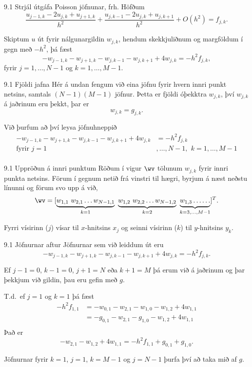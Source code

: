 \begin{frame}{9.1 Strjál útgáfa Poisson jöfnunar, frh.}
Höfðum 
$$
  \frac{u_{j-1,k} - 2u_{j,k} + u_{j+1,k}}{h^2} +
  \frac{u_{j,k-1} - 2u_{j,k} + u_{j,k+1}}{h^2}
  + O(h^2) = f_{j,k}.
  $$
\pause\medskip
  
  Skiptum $u$ út fyrir nálgunargildin $w_{j,k}$, hendum skekkjuliðnum og
  margföldum í gegn með $-h^2$, \pause þá fæst
  $$
  -w_{j-1,k} - w_{j+1,k} - w_{j,k-1} - w_{j,k+1} + 4w_{j,k} = -h^2 f_{j,k},
  $$
 fyrir $j = 1,\ldots,N-1$ og $k=1,\ldots,M-1$.
\end{frame}

\begin{frame}{9.1 Fjöldi jafna}
 Hér á undan fengum við eina jöfnu fyrir hvern innri punkt netsins, 
 samtals $(N-1)(M-1)$ jöfnur. Þetta er fjöldi óþekktra $w_{j,k}$, því
 $w_{j,k}$ á jaðrinum eru þekkt, þar er 
 $$
    w_{j,k} = g_{j,k}.
 $$
 
 \pause\medskip
 Við þurfum að því leysa jöfnuhneppið
 \begin{align*}
  -w_{j-1,k} - w_{j+1,k} - w_{j,k-1} - w_{j,k+1} + 4w_{j,k} &= -h^2 f_{j,k} \\ 
   \text{fyrir } j=1&,\ldots,N-1, \ \, k=1,\ldots,M-1\\
 \end{align*}
\end{frame}

\begin{frame}{9.1 Uppröðun á innri punktum}
 Röðum í vigur $\wv$ tölunum $w_{j,k}$ fyrir innri punkta netsins. 
 Förum í gegnum netið frá vinstri til hægri, byrjum á 
 næst neðstu línunni og förum svo upp á við,
 $$
  \wv = [ \underbrace{w_{1,1} \ w_{2,1} \ldots w_{N-1,1}}_{k=1} 
  \ \underbrace{w_{1,2} \ w_{2,2} \ldots w_{N-1,2}}_{k=2} \ 
  \underbrace{w_{1,3} \ldots  \ldots}_{k=3,\ldots,M-1} ]^T.
 $$
 
 Fyrri vísirinn ($j$) vísar til $x$-hnitsins $x_j$ og seinni vísirinn ($k$)
 til $y$-hnitsins $y_k$.
\end{frame}

\begin{frame}{9.1 Jöfnurnar aftur}
Jöfnurnar sem við leiddum út eru
 $$
  -w_{j-1,k} - w_{j+1,k} - w_{j,k-1} - w_{j,k+1} + 4w_{j,k} = -h^2 f_{j,k}.
 $$
 \pause\medskip
 
 Ef $j-1=0$, $k-1 =0$, $j+1=N$ eða $k+1=M$ þá erum við á jaðrinum og þar
 þekkjum við gildin, þau eru gefin með $g$.
 \pause\medskip
 
 T.d.~ef $j=1$ og $k=1$ þá fæst 
 \begin{align*}
  -h^2 f_{1,1} &= -w_{0,1} - w_{2,1} - w_{1,0} - w_{1,2} + 4w_{1,1} \\
  &= -g_{0,1} - w_{2,1} - g_{1,0} - w_{1,2} + 4w_{1,1}\\
 \end{align*}\pause
 Það er
 $$
  - w_{2,1} - w_{1,2} + 4w_{1,1} = 
  -h^2 f_{1,1}  + g_{0,1} + g_{1,0}.
 $$
 \pause\medskip
 
Jöfnurnar fyrir $k=1$, $j=1$, $k=M-1$ og $j=N-1$ þurfa því að taka
mið af $g$.
\end{frame}


